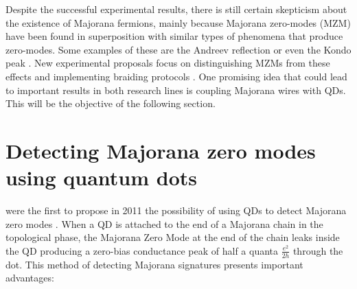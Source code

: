 Despite the successful experimental results, there is still certain  skepticism about the existence of Majorana fermions, mainly because Majorana zero-modes (MZM) have been found in superposition with similar types of phenomena that produce zero-modes. Some examples of these are the Andreev reflection \cite{sarma_majorana_2012} or even the Kondo peak \cite{gorski_interplay_2018}. New experimental proposals focus on distinguishing MZMs from these effects and implementing  braiding protocols \cite{aasen_milestones_2016,sarma_majorana_2015,heck_coulomb-assisted_2012} . One promising idea that could lead to important results in both research lines is coupling Majorana wires with QDs. This will be the objective of the following section. 


\section{Detecting Majorana zero modes using quantum dots}

\citeauthor{liu_detecting_2011} were the first to propose in 2011 the possibility of using QDs to detect Majorana zero modes \cite{liu_detecting_2011} . When a QD is attached to the end of a Majorana chain in the topological phase,  the Majorana Zero Mode at the end of the chain leaks inside the QD \cite{vernek_subtle_2014} producing a zero-bias conductance peak of half a quanta $\frac{e^{2}}{2h}$ through the dot. This method of detecting Majorana signatures presents important advantages:


